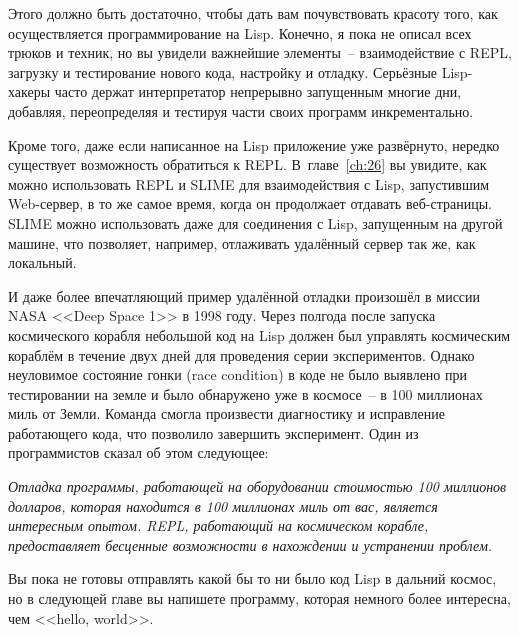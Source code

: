 Этого должно быть достаточно, чтобы дать вам почувствовать красоту того, как
осуществляется программирование на Lisp. Конечно, я пока не описал всех трюков и техник,
но вы увидели важнейшие элементы~-- взаимодействие с REPL, загрузку и тестирование нового
кода, настройку и отладку. Серьёзные Lisp-хакеры часто держат интерпретатор непрерывно
запущенным многие дни, добавляя, переопределяя и тестируя части своих программ
инкрементально.

Кроме того, даже если написанное на Lisp приложение уже развёрнуто, нередко существует
возможность обратиться к REPL. В~главе~\ref{ch:26} вы увидите, как можно использовать REPL
и SLIME для взаимодействия с Lisp, запустившим Web-сервер, в то же самое время, когда он
продолжает отдавать веб-страницы. SLIME можно использовать даже для соединения с Lisp,
запущенным на другой машине, что позволяет, например, отлаживать удалённый сервер так же,
как локальный.

И даже более впечатляющий пример удалённой отладки произошёл в миссии NASA <<Deep Space 1>>
в 1998 году. Через полгода после запуска космического корабля небольшой код на Lisp
должен был управлять космическим кораблём в течение двух дней для проведения серии
экспериментов. Однако неуловимое состояние гонки (race condition) в коде не было выявлено
при тестировании на земле и было обнаружено уже в космосе~-- в 100 миллионах миль от Земли.
Команда смогла произвести диагностику и исправление работающего кода, что позволило завершить
эксперимент. Один из
программистов сказал об этом следующее:

\emph{Отладка программы, работающей на оборудовании стоимостью 100 миллионов долларов, которая
находится в 100 миллионах миль от вас, является интересным опытом. REPL, работающий на
космическом корабле, предоставляет бесценные возможности в нахождении и устранении
проблем.}

Вы пока не готовы отправлять какой бы то ни было код Lisp в дальний космос, но в следующей
главе вы напишете программу, которая немного более интересна, чем <<hello, world>>.

